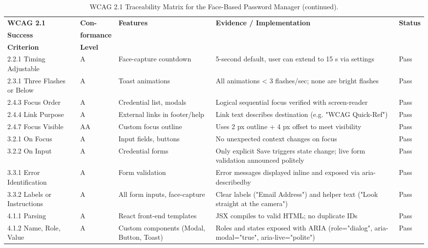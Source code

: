 \begin{table}[htbp]
  \centering
  \small
  \begin{tabular}{|p{2.5cm}|p{1.5cm}|p{4cm}|p{4cm}|p{1.2cm}|}
    \hline
    \textbf{WCAG 2.1} & \textbf{Con-} & \textbf{Features} & \textbf{Evidence / Implementation} & \textbf{Status} \\
    \textbf{Success} & \textbf{formance} & & & \\
    \textbf{Criterion} & \textbf{Level} & & & \\ \hline
    
    2.2.1 Timing Adjustable & A & Face-capture countdown & 5-second default, user can extend to 15 s via settings & Pass \\ \hline
    
    2.3.1 Three Flashes or Below & A & Toast animations & All animations < 3 flashes/sec; none are bright flashes & Pass \\ \hline
    
    2.4.3 Focus Order & A & Credential list, modals & Logical sequential focus verified with screen-reader & Pass \\ \hline
    
    2.4.4 Link Purpose & A & External links in footer/help & Link text describes destination (e.g. "WCAG Quick-Ref") & Pass \\ \hline
    
    2.4.7 Focus Visible & AA & Custom focus outline & Uses 2 px outline + 4 px offset to meet visibility & Pass \\ \hline
    
    3.2.1 On Focus & A & Input fields, buttons & No unexpected context changes on focus & Pass \\ \hline
    
    3.2.2 On Input & A & Credential forms & Only explicit Save triggers state change; live form validation announced politely & Pass \\ \hline
    
    3.3.1 Error Identification & A & Form validation & Error messages displayed inline and exposed via aria-describedby & Pass \\ \hline
    
    3.3.2 Labels or Instructions & A & All form inputs, face-capture & Clear labels ("Email Address") and helper text ("Look straight at the camera") & Pass \\ \hline
    
    4.1.1 Parsing & A & React front-end templates & JSX compiles to valid HTML; no duplicate IDs & Pass \\ \hline
    
    4.1.2 Name, Role, Value & A & Custom components (Modal, Button, Toast) & Roles and states exposed with ARIA (role="dialog", aria-modal="true", aria-live="polite") & Pass \\ \hline
  \end{tabular}
  \caption[WCAG 2.1 Traceability Matrix (continued)]{WCAG 2.1 Traceability Matrix for the Face-Based Password Manager (continued).}
  \label{tab:wcag-matrix-cont}
\end{table}

